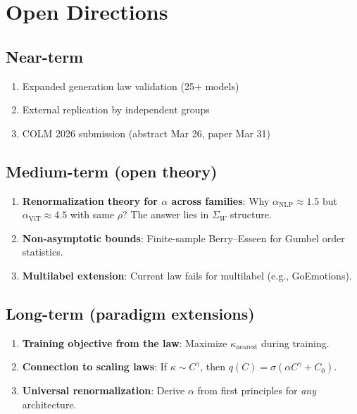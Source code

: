 \documentclass[11pt,a4paper]{article}
\begin{document}
\section{Open Directions}

\subsection{Near-term}
\begin{enumerate}[nosep]
\item Expanded generation law validation (25+ models)
\item External replication by independent groups
\item COLM 2026 submission (abstract Mar 26, paper Mar 31)
\end{enumerate}

\subsection{Medium-term (open theory)}
\begin{enumerate}[nosep, start=4]
\item \textbf{Renormalization theory for $\alpha$ across families}: Why $\alpha_\mathrm{NLP} \approx 1.5$ but $\alpha_\mathrm{ViT} \approx 4.5$ with same $\rho$? The answer lies in $\Sigma_W$ structure.
\item \textbf{Non-asymptotic bounds}: Finite-sample Berry--Esseen for Gumbel order statistics.
\item \textbf{Multilabel extension}: Current law fails for multilabel (e.g., GoEmotions).
\end{enumerate}

\subsection{Long-term (paradigm extensions)}
\begin{enumerate}[nosep, start=7]
\item \textbf{Training objective from the law}: Maximize $\kappa_\mathrm{nearest}$ during training.
\item \textbf{Connection to scaling laws}: If $\kappa \sim C^\gamma$, then $q(C) = \sigma(\alpha C^\gamma + C_0)$.
\item \textbf{Universal renormalization}: Derive $\alpha$ from first principles for \emph{any} architecture.
\end{enumerate}
\end{document}
